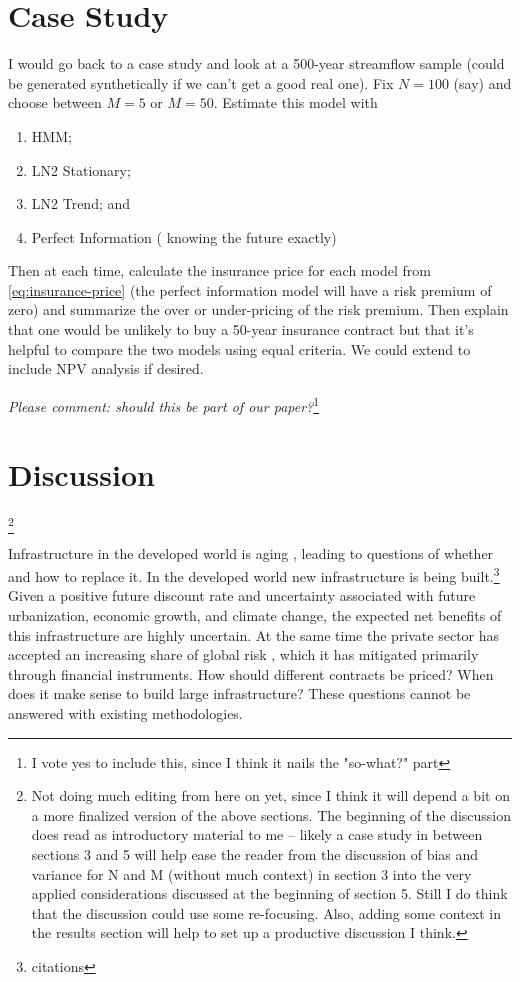 \documentclass[12pt]{article}
\begin{document}
\section{Case Study}

I would go back to a case study and look at a 500-year streamflow sample (could be generated synthetically if we can't get a good real one).
Fix $N=100$ (say) and choose between $M=5$ or $M=50$. 
Estimate this model with 
\begin{enumerate}[label=(\roman*)]
  \item HMM;
  \item LN2 Stationary;
  \item LN2 Trend; and
  \item Perfect Information (\ie{} knowing the future exactly)
\end{enumerate}
Then at each time, calculate the insurance price for each model from \cref{eq:insurance-price} (the perfect information model will have a risk premium of zero) and summarize the over or under-pricing of the risk premium.
Then explain that one would be unlikely to buy a 50-year insurance contract but that it's helpful to compare the two models using equal criteria.
We could extend to include NPV analysis if desired.

\emph{Please comment: should this be part of our paper?}\footnote{I vote yes to include this, since I think it nails the "so-what?" part}


\section{Discussion}\footnote{Not doing much editing from here on yet, since I think it will depend a bit on a more finalized version of the above sections. The beginning of the discussion does read as introductory material to me -- likely a case study in between sections 3 and 5 will help ease the reader from the discussion of bias and variance for N and M (without much context) in section 3 into the very applied considerations discussed at the beginning of section 5. Still I do think that the discussion could use some re-focusing. Also, adding some context in the results section will help to set up a productive discussion I think.}


Infrastructure in the developed world is aging \citep{Ho2017}, leading to questions of whether and how to replace it.
In the developed world new infrastructure is being built.\footnote{citations}
Given a positive future discount rate and uncertainty associated with future urbanization, economic growth, and climate change, the expected net benefits of this infrastructure are highly uncertain.
At the same time the private sector has accepted an increasing share of global risk \citep{WorldEconomicForum2016}, which it has mitigated primarily through financial instruments.
How should different contracts be priced? When does it make sense to build large infrastructure?
These questions cannot be answered with existing methodologies.
\end{document}
